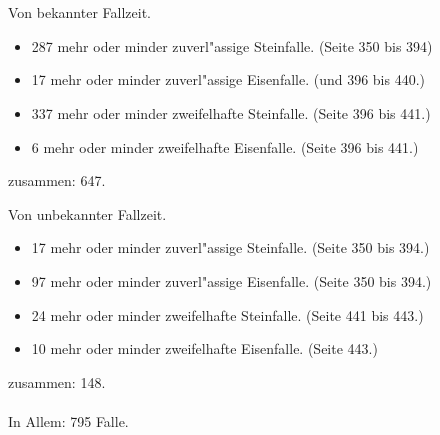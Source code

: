 \documentclass[a4paper, 8pt, oneside, polutonikogreek, german]{article}
\begin{document}
\section{}
\begin{center}
Von bekannter Fallzeit.
\end{center}
\begin{itemize}
    \item 287 mehr oder minder zuverl"assige Steinfalle. (Seite 350 bis 394)
    \item 17 mehr oder minder zuverl"assige Eisenfalle. (und 396 bis 440.)
    \item 337 mehr oder minder zweifelhafte Steinfalle. (Seite 396 bis 441.)
    \item 6 mehr oder minder zweifelhafte Eisenfalle. (Seite 396 bis 441.)
\end{itemize}
\begin{center}
zusammen: 647.
\end{center}
\begin{center}
Von unbekannter Fallzeit.
\end{center}
\begin{itemize}
    \item 17 mehr oder minder zuverl"assige Steinfalle. (Seite 350 bis 394.)
    \item 97 mehr oder minder zuverl"assige Eisenfalle. (Seite 350 bis 394.)
    \item 24 mehr oder minder zweifelhafte Steinfalle. (Seite 441 bis 443.)
    \item 10 mehr oder minder zweifelhafte Eisenfalle. (Seite 443.)
\end{itemize}
\begin{center}
zusammen: 148.
\end{center}

\paragraph{}
In Allem: 795 Falle.
\end{document}
